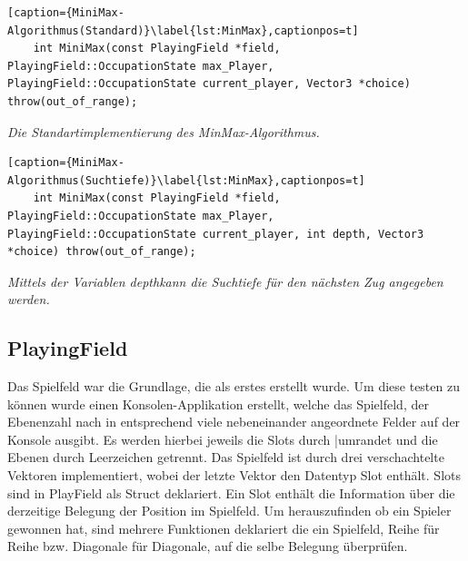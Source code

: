 \documentclass[a4paper]{scrartcl}
\begin{document}
\begin{lstlisting}[caption={MiniMax- Algorithmus(Standard)}\label{lst:MinMax},captionpos=t]
	int MiniMax(const PlayingField *field, PlayingField::OccupationState max_Player, PlayingField::OccupationState current_player, Vector3 *choice) throw(out_of_range);
\end{lstlisting}
\textit{Die Standartimplementierung des MinMax-Algorithmus.}

\begin{lstlisting}[caption={MiniMax- Algorithmus(Suchtiefe)}\label{lst:MinMax},captionpos=t]
	int MiniMax(const PlayingField *field, PlayingField::OccupationState max_Player, PlayingField::OccupationState current_player, int depth, Vector3 *choice) throw(out_of_range);
\end{lstlisting}
\textit{Mittels der Variablen \glqq depth\grqq kann die Suchtiefe für den nächsten Zug angegeben werden.}

\subsection{PlayingField}\label{ch:PlayingField}
Das Spielfeld war die Grundlage, die als erstes erstellt wurde. Um diese testen zu können wurde einen Konsolen-Applikation erstellt, welche das Spielfeld, der Ebenenzahl nach in entsprechend viele nebeneinander angeordnete Felder auf der Konsole ausgibt. Es werden hierbei jeweils die Slots durch \glqq|\grqq umrandet und die Ebenen durch Leerzeichen getrennt. Das Spielfeld ist durch drei verschachtelte Vektoren implementiert, wobei der letzte Vektor den Datentyp Slot enthält. Slots sind in PlayField als Struct deklariert. Ein Slot enthält die Information über die derzeitige Belegung der Position im Spielfeld. Um herauszufinden ob ein Spieler gewonnen hat, sind mehrere  Funktionen deklariert die ein Spielfeld, Reihe für Reihe bzw. Diagonale für Diagonale, auf die selbe Belegung überprüfen.
\end{document}
